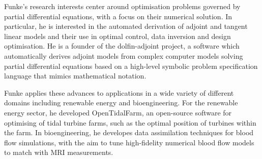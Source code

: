\documentclass[11pt]{article}
\begin{document}
Funke's research interests center around optimisation problems governed by
partial differential equations, with a focus on their numerical solution. In
particular, he is interested in the automated derivation of adjoint and tangent
linear models and their use in optimal control, data inversion and design optimisation.
He is a founder of the dolfin-adjoint project, a software which automatically
derives adjoint models from complex computer models solving partial
differential equations based on a high-level symbolic problem specification
language that mimics mathematical notation.

Funke applies these advances to applications in a wide variety of different
domains including renewable energy and bioengineering. For the renewable energy
sector, he developed OpenTidalFarm, an open-source software for optimising of
tidal turbine farms, such as the optimal position of turbines within the farm.
In bioengineering, he developes data assimilation techniques for blood flow
simulations, with the aim to tune high-fidelity numerical blood flow models to
match with MRI measurements.
\end{document}
